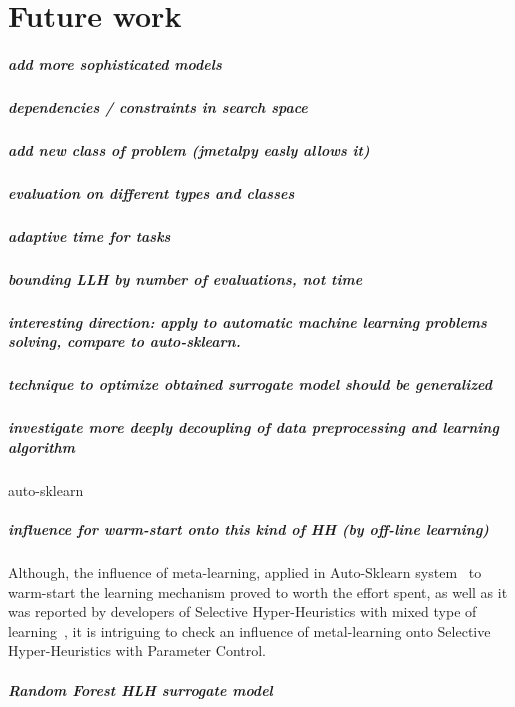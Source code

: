 \chapter{Future work}
\paragraph{add more sophisticated models}
\paragraph{dependencies / constraints in search space}
\paragraph{add new class of problem (jmetalpy easly allows it)}
\paragraph{evaluation on different types and classes}
\paragraph{adaptive time for tasks}
\paragraph{bounding LLH by number of evaluations, not time}
\paragraph{interesting direction: apply to automatic machine learning problems solving, compare to auto-sklearn.}
\paragraph{technique to optimize obtained surrogate model should be generalized}
\paragraph{investigate more deeply decoupling of data preprocessing and learning algorithm} auto-sklearn
\paragraph{influence for warm-start onto this kind of HH (by off-line learning)}
Although, the influence of meta-learning, applied in Auto-Sklearn system~\cite{feurer2015efficient} to warm-start the learning mechanism proved to worth the effort spent, as well as it was reported by developers of Selective Hyper-Heuristics with mixed type of learning~\cite{uludaug2013hybrid,}, it is intriguing to check an influence of metal-learning onto Selective Hyper-Heuristics with Parameter Control.

\paragraph{Random Forest HLH surrogate model}

